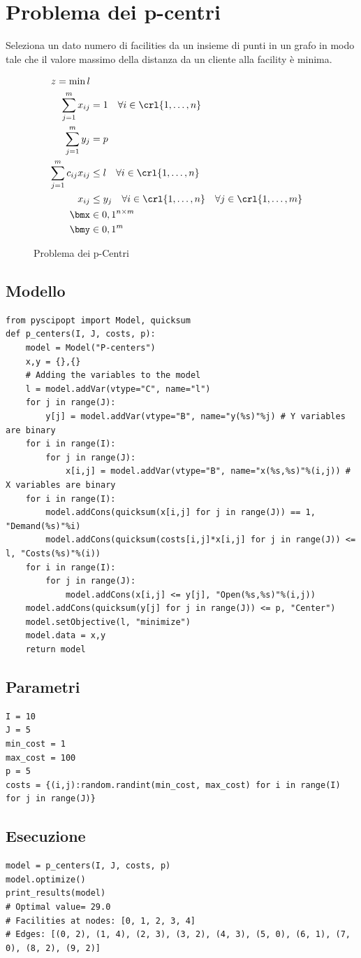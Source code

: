 \documentclass[\main/main.tex]{subfiles}
\begin{document}
\chapter{Problema dei p-centri}
Seleziona un dato numero di facilities da un insieme di punti in un grafo in modo tale che il valore massimo della distanza da un cliente alla facility è minima.

\begin{figure}
    \begin{align*}
        z = \min l \\
        \sum_{j=1}^m x_{ij} &= 1 \quad \forall i \in \crl{1, \ldots, n}\\
        \sum_{j=1}^m y_{j} &= p\\
        \sum_{j=1}^m c_{ij}x_{ij} &\leq l \quad \forall i \in \crl{1, \ldots, n}\\
        x_{ij} &\leq y_j \quad \forall i \in \crl{1, \ldots, n} \quad \forall j \in \crl{1, \ldots, m}\\
        \bmx &\in {0,1}^{n\times m}\\
        \bmy &\in {0,1}^m
    \end{align*}
    \caption{Problema dei p-Centri}
\end{figure}
\section{Modello}
\begin{verbatim}
from pyscipopt import Model, quicksum
def p_centers(I, J, costs, p):
    model = Model("P-centers")
    x,y = {},{}
    # Adding the variables to the model
    l = model.addVar(vtype="C", name="l")
    for j in range(J):
        y[j] = model.addVar(vtype="B", name="y(%s)"%j) # Y variables are binary
    for i in range(I):
        for j in range(J):
            x[i,j] = model.addVar(vtype="B", name="x(%s,%s)"%(i,j)) # X variables are binary
    for i in range(I):
        model.addCons(quicksum(x[i,j] for j in range(J)) == 1, "Demand(%s)"%i)
        model.addCons(quicksum(costs[i,j]*x[i,j] for j in range(J)) <= l, "Costs(%s)"%(i))
    for i in range(I):
        for j in range(J):
            model.addCons(x[i,j] <= y[j], "Open(%s,%s)"%(i,j))
    model.addCons(quicksum(y[j] for j in range(J)) <= p, "Center")
    model.setObjective(l, "minimize")
    model.data = x,y
    return model
\end{verbatim}
\clearpage
\section{Parametri}
\begin{verbatim}
I = 10
J = 5
min_cost = 1
max_cost = 100
p = 5
costs = {(i,j):random.randint(min_cost, max_cost) for i in range(I) for j in range(J)}
\end{verbatim}
\section{Esecuzione}
\begin{verbatim}
model = p_centers(I, J, costs, p)
model.optimize()
print_results(model)
# Optimal value= 29.0
# Facilities at nodes: [0, 1, 2, 3, 4]
# Edges: [(0, 2), (1, 4), (2, 3), (3, 2), (4, 3), (5, 0), (6, 1), (7, 0), (8, 2), (9, 2)]
\end{verbatim}
\end{document}
